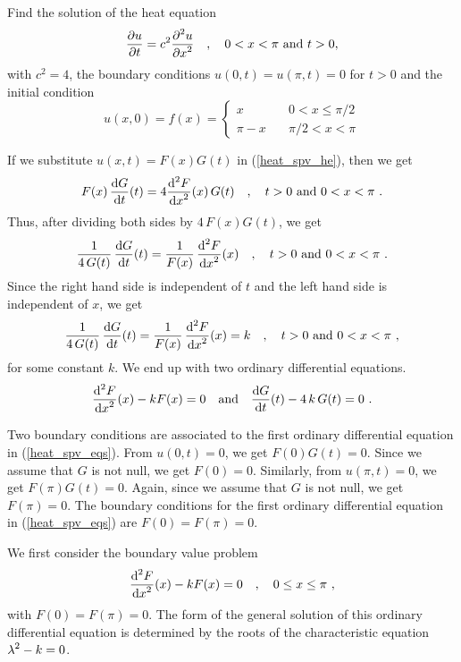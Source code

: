 \begin{egg}
Find the solution of the heat equation
\begin{equation} \label{heat_spv_he}
\frac{\partial{u}}{\partial t} = c^2 \frac{\displaystyle \partial^{2}{u}} {\displaystyle \partial x^{2}} \quad ,
\quad 0 < x < \pi \ \text{and} \ t > 0 ,
\end{equation}
with $c^2 = 4$, the boundary conditions
$u(0,t) = u(\pi,t) = 0$ for $t>0$ and the initial condition
\begin{equation} \label{heat_series_init_cond}
u(x,0) = f(x) = \begin{cases}
x & \quad 0 < x \leq \pi/2 \\
\pi - x & \quad \pi/2 < x < \pi
\end{cases}
\end{equation}

If we substitute $u(x,t) = F(x)G(t)$ in (\ref{heat_spv_he}), then we get
\[
F(x)\,\frac{\mathrm{d}G}{\mathrm{d}{t}}(t) = 4 \frac{\displaystyle \mathrm{d}^{2}{F}} {\displaystyle \mathrm{d}{x}^{2}}(x)\, G(t)
\quad , \quad t>0 \ \text{and} \ 0<x<\pi \ .
\]
Thus, after dividing both sides by $4\,F(x)G(t)$, we get
\[
\frac{1}{4\,G(t)} \, \frac{\mathrm{d}G}{\mathrm{d}{t}}(t) = \frac{1}{F(x)}\, \frac{\displaystyle \mathrm{d}^{2}{F}} {\displaystyle \mathrm{d}{x}^{2}}(x)
\quad , \quad t>0 \ \text{and} \ 0<x<\pi \ .
\]
Since the right hand side is independent of $t$ and the left hand side
is independent of $x$, we get
\[
\frac{1}{4\,G(t)} \, \frac{\mathrm{d}G}{\mathrm{d}{t}}(t) = \frac{1}{F(x)}\,
\frac{\displaystyle \mathrm{d}^{2}{F}} {\displaystyle \mathrm{d}{x}^{2}}(x) = k \quad , \quad t>0 \ \text{and} \ 0<x<\pi \ ,
\]
for some constant $k$.  We end up with two ordinary differential equations.
\begin{equation} \label{heat_spv_eqs}
\frac{\displaystyle \mathrm{d}^{2}{F}} {\displaystyle \mathrm{d}{x}^{2}}(x) -k F(x) = 0 \quad \text{and}
\quad \frac{\mathrm{d}G}{\mathrm{d}{t}}(t) - 4\,k\,G(t) = 0 \ .
\end{equation}

Two boundary conditions are associated to the first ordinary
differential equation in (\ref{heat_spv_eqs}).   From $u(0,t) = 0$, we
get $F(0)G(t)=0$.  Since we assume that $G$ is not null, we get
$F(0)=0$.  Similarly, from $u(\pi,t) = 0$, we get $F(\pi)G(t)=0$.
Again, since we assume that $G$ is not null, we get $F(\pi)=0$.
The boundary conditions for the first ordinary differential equation
in (\ref{heat_spv_eqs}) are $F(0)=F(\pi)=0$.

We first consider the boundary value problem
\begin{equation} \label{heat_spv_bvp}
\dydxn{F}{x}{2}(x) -k F(x) = 0 \quad , \quad 0 \leq x \leq \pi \ ,
\end{equation}
with $F(0)=F(\pi)=0$.  The form of the general solution of this
ordinary differential equation is determined by the roots of the
characteristic equation $\displaystyle \lambda^2-k=0$.


\end{egg}
